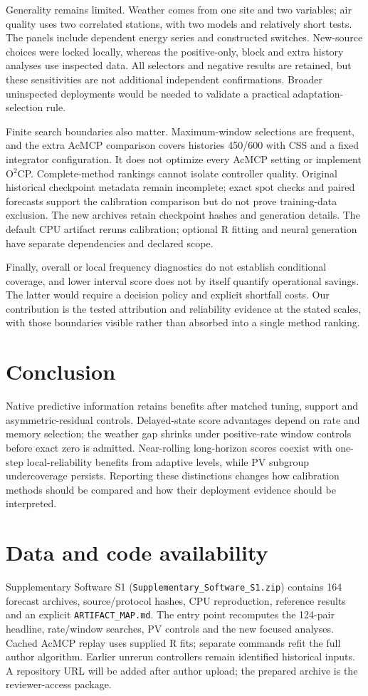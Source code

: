 Generality remains limited. Weather comes from one site and two variables; air
quality uses two correlated stations, with two models and relatively short tests.
The panels include dependent energy series and constructed switches. New-source
choices were locked locally, whereas the positive-only, block and extra history
analyses use inspected data. All selectors and negative results are retained, but
these sensitivities are not additional independent confirmations. Broader uninspected
deployments would be needed to validate a practical adaptation-selection rule.

Finite search boundaries also matter. Maximum-window selections are frequent, and
the extra AcMCP comparison covers histories 450/600 with CSS and a fixed integrator
configuration. It does not optimize every AcMCP setting or implement O$^2$CP.
Complete-method rankings cannot isolate controller quality. Original historical
checkpoint metadata remain incomplete; exact spot checks and paired forecasts
support the calibration comparison but do not prove training-data exclusion.
The new archives retain checkpoint hashes and generation details. The default
CPU artifact reruns calibration; optional R fitting and neural generation have
separate dependencies and declared scope.

Finally, overall or local frequency diagnostics do not establish conditional coverage,
and lower interval score does not by itself quantify operational savings. The latter
would require a decision policy and explicit shortfall costs. Our contribution is
the tested attribution and reliability evidence at the stated scales, with those
boundaries visible rather than absorbed into a single method ranking.

\section{Conclusion}
Native predictive information retains benefits after matched tuning, support and
asymmetric-residual controls. Delayed-state score advantages depend on rate and
memory selection; the weather gap shrinks under positive-rate window controls
before exact zero is admitted. Near-rolling long-horizon scores coexist with
one-step local-reliability benefits from adaptive levels, while PV subgroup
undercoverage persists. Reporting these distinctions changes how calibration
methods should be compared and how their deployment evidence should be interpreted.

\section*{Data and code availability}
Supplementary Software S1 (\texttt{Supplementary\_Software\_S1.zip}) contains
164 forecast archives, source/protocol hashes, CPU reproduction, reference results
and an explicit \texttt{ARTIFACT\_MAP.md}. The entry point recomputes the 124-pair
headline, rate/window searches, PV controls and the new focused analyses. Cached
AcMCP replay uses supplied R fits; separate commands refit the full author algorithm.
Earlier unrerun controllers remain identified historical inputs. A repository URL
will be added after author upload; the prepared archive is the reviewer-access package.

